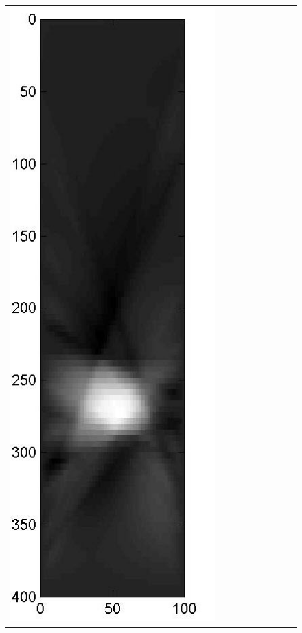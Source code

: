 \documentclass[english]{siamltex}
\begin{document}
{\begin{figure}[!h]
\begin{center}
\begin{tabular}{|c|c|c|c|c|c|c|c|c|}
			\includegraphics[width=.9\iwidth]{figures/newFigs/noisy/resultsExp-6-mk}
			&

\end{tabular}
\end{center}
\end{figure}}
\end{document}
